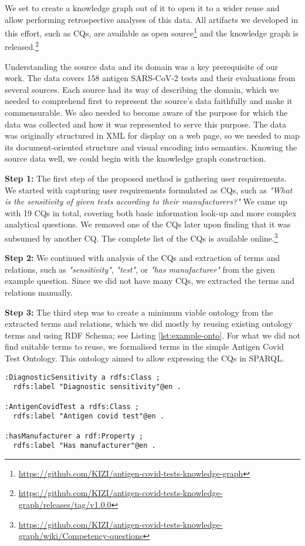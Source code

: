\documentclass[
]{ceurart}
\begin{document}
We set to create a knowledge graph out of it to open it to a wider reuse and allow performing retrospective analyses of this data.
All artifacts we developed in this effort, such as CQs, are available as open source\footnote{\url{https://github.com/KIZI/antigen-covid-tests-knowledge-graph}} and the knowledge graph is released.\footnote{\url{https://github.com/KIZI/antigen-covid-tests-knowledge-graph/releases/tag/v1.0.0}}

Understanding the source data and its domain was a key prerequisite of our work. The data covers 158 antigen SARS-CoV-2 tests and their evaluations from several sources. Each source had its way of describing the domain, which we needed to comprehend first to represent the source's data faithfully and make it commensurable. We also needed to become aware of the purpose for which the data was collected and how it was represented to serve this purpose. The data was originally structured in XML for display on a web page, so we needed to map its document-oriented structure and visual encoding into semantics. Knowing the source data well, we could begin with the knowledge graph construction.

\textbf{Step 1:} The first step of the proposed method is gathering user requirements. We started with capturing user requirements formulated as CQs, such as \textit{"What is the sensitivity of given tests according to their manufacturers?"} We came up with 19 CQs in total, covering both basic information look-up and more complex analytical questions. We removed one of the CQs later upon finding that it was subsumed by another CQ. The complete list of the CQs is available online.\footnote{\url{https://github.com/KIZI/antigen-covid-tests-knowledge-graph/wiki/Competency-questions}}

\textbf{Step 2:} We continued with analysis of the CQs and extraction of terms and relations, such as \textit{"sensitivity"}, \textit{"test"}, or \textit{"has manufacturer"} from the given example question. Since we did not have many CQs, we extracted the terms and relations manually.

\textbf{Step 3:} The third step was to create a minimum viable ontology from the extracted terms and relations, which we did mostly by reusing existing ontology terms and using RDF Schema; see Listing \ref{lst:example-onto}. For what we did not find suitable terms to reuse, we formalised terms in the simple Antigen Covid Test Ontology. This ontology aimed to allow expressing the CQs in SPARQL.

\begin{lstlisting}[language=turtle, caption=Example ontology terms, label={lst:example-onto}]
:DiagnosticSensitivity a rdfs:Class ;
  rdfs:label "Diagnostic sensitivity"@en .

:AntigenCovidTest a rdfs:Class ;
  rdfs:label "Antigen covid test"@en .

:hasManufacturer a rdf:Property ;
  rdfs:label "Has manufacturer"@en .
\end{lstlisting}
\end{document}
